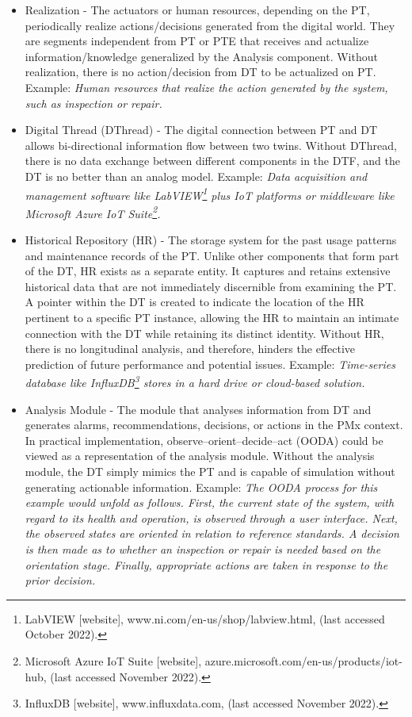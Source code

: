 \documentclass[runningheads]{llncs}
\begin{document}
\begin{itemize}
    \item Realization - The actuators or human resources, depending on the PT, periodically realize actions/decisions generated from the digital world. They are segments independent from PT or PTE that receives and actualize information/knowledge generalized by the Analysis component. Without realization, there is no action/decision from DT to be actualized on PT. Example: \textit{Human resources that realize the action generated by the system, such as inspection or repair.}
    \item Digital Thread (DThread) - The digital connection between PT and DT allows  bi-directional information flow between two twins. Without DThread, there is no data exchange between different components in the DTF, and the DT is no better than an analog model. Example: \textit{Data acquisition and management software like LabVIEW\footnote{LabVIEW [website], www.ni.com/en-us/shop/labview.html, (last accessed October 2022).} plus IoT platforms or middleware like Microsoft Azure IoT Suite\footnote{Microsoft Azure IoT Suite [website], azure.microsoft.com/en-us/products/iot-hub, (last accessed November 2022).}.}
    \item Historical Repository (HR) - The storage system for the past usage patterns and maintenance records of the PT. Unlike other components that form part of the DT, HR exists as a separate entity. It captures and retains extensive historical data that are not immediately discernible from examining the PT. A pointer within the DT is created to indicate the location of the HR pertinent to a specific PT instance, allowing the HR to maintain an intimate connection with the DT while retaining its distinct identity. Without HR, there is no longitudinal analysis, and therefore, hinders the effective prediction of future performance and potential issues. Example: \textit{Time-series database like InfluxDB\footnote{InfluxDB [website], www.influxdata.com, (last accessed November 2022).} stores in a hard drive or cloud-based solution.}
    \item Analysis Module - The module that analyses information from DT and generates alarms, recommendations, decisions, or actions in the PMx context. In practical implementation, observe–orient–decide–act (OODA) could be viewed as a representation of the analysis module. Without the analysis module, the DT simply mimics the PT and is capable of simulation without generating actionable information. Example: \textit{The OODA process for this example would unfold as follows. First, the current state of the system, with regard to its health and operation, is observed through a user interface. Next, the observed states are oriented in relation to reference standards. A decision is then made as to whether an inspection or repair is needed based on the orientation stage. Finally, appropriate actions are taken in response to the prior decision.}

\end{itemize}
\end{document}
